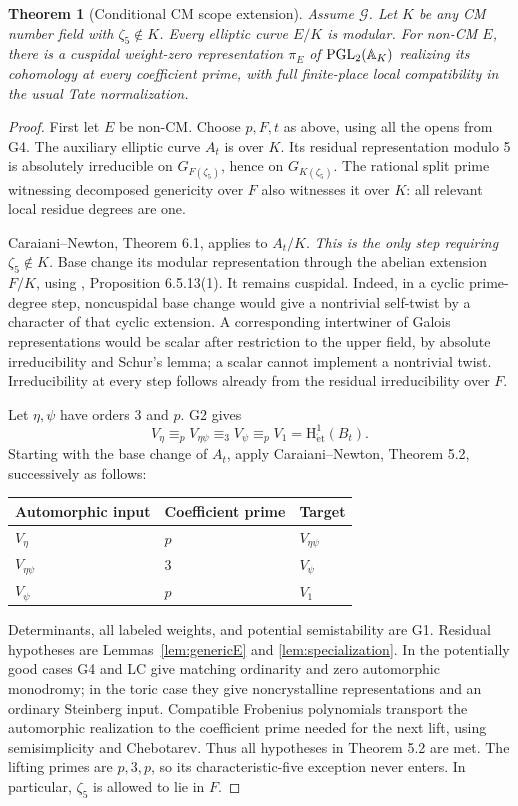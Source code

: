 \documentclass[11pt,a4paper]{article}
\newtheorem{theorem}{Theorem}[section]
\theoremstyle{definition}\newtheorem{definition}[theorem]{Definition}
\theoremstyle{remark}\newtheorem*{remark}{Remark}
\newcommand{\HH}{\mathrm H^1_{\mathrm{\acute et}}}
\newcommand{\Ginput}{\mathcal G}
\begin{document}
\begin{theorem}[Conditional CM scope extension]\label{thm:CM}
Assume \(\Ginput\). Let \(K\) be any CM number field with
\(\zeta_5\notin K\). Every elliptic curve \(E/K\) is modular.
For non-CM \(E\), there is a cuspidal weight-zero representation
\(\pi_E\) of \(\operatorname{PGL}_2(\mathbb A_K)\) realizing its cohomology at every coefficient
prime, with full finite-place local compatibility in the usual
Tate normalization.
\end{theorem}
\begin{proof}
First let \(E\) be non-CM. Choose \(p,F,t\) as above, using all the opens
from G4. The auxiliary elliptic curve \(A_t\) is over \(K\).
Its residual representation modulo 5 is absolutely irreducible on
\(G_{F(\zeta_5)}\), hence on \(G_{K(\zeta_5)}\).
The rational split prime witnessing decomposed genericity over \(F\) also
witnesses it over \(K\): all relevant local residue degrees are one.

Caraiani--Newton, Theorem 6.1, applies to \(A_t/K\).
\emph{This is the only step requiring \(\zeta_5\notin K\).}
Base change its modular representation through the abelian extension \(F/K\),
using \cite{ACC}, Proposition 6.5.13(1).
It remains cuspidal. Indeed, in a cyclic prime-degree step, noncuspidal base
change would give a nontrivial self-twist by a character of that cyclic
extension. A corresponding intertwiner of Galois representations would be
scalar after restriction to the upper field, by absolute irreducibility and
Schur's lemma; a scalar cannot implement a nontrivial twist.
Irreducibility at every step follows already from the residual
irreducibility over \(F\).

Let \(\eta,\psi\) have orders 3 and \(p\). G2 gives
\begin{equation}
 V_\eta\equiv_p V_{\eta\psi}
       \equiv_3 V_\psi
       \equiv_p V_1=\HH(B_t).                  \label{eq:switch}
\end{equation}
Starting with the base change of \(A_t\), apply Caraiani--Newton,
Theorem 5.2, successively as follows:
\begin{center}
\begin{tabular}{lll}
\toprule
Automorphic input&Coefficient prime&Target\\
\midrule
\(V_\eta\)&\(p\)&\(V_{\eta\psi}\)\\
\(V_{\eta\psi}\)&\(3\)&\(V_\psi\)\\
\(V_\psi\)&\(p\)&\(V_1\)\\
\bottomrule
\end{tabular}
\end{center}
Determinants, all labeled weights, and potential semistability are G1.
Residual hypotheses are Lemmas~\ref{lem:genericE} and
\ref{lem:specialization}. In the potentially good cases G4 and LC give matching
ordinarity and zero automorphic monodromy; in the toric case they give
noncrystalline representations and an ordinary Steinberg input.
Compatible Frobenius polynomials transport the automorphic realization to the
coefficient prime needed for the next lift, using semisimplicity and
Chebotarev. Thus all hypotheses in Theorem 5.2 are met.
The lifting primes are \(p,3,p\), so its characteristic-five exception
never enters. In particular, \(\zeta_5\) is allowed to lie in \(F\).


\end{proof}
\end{document}
